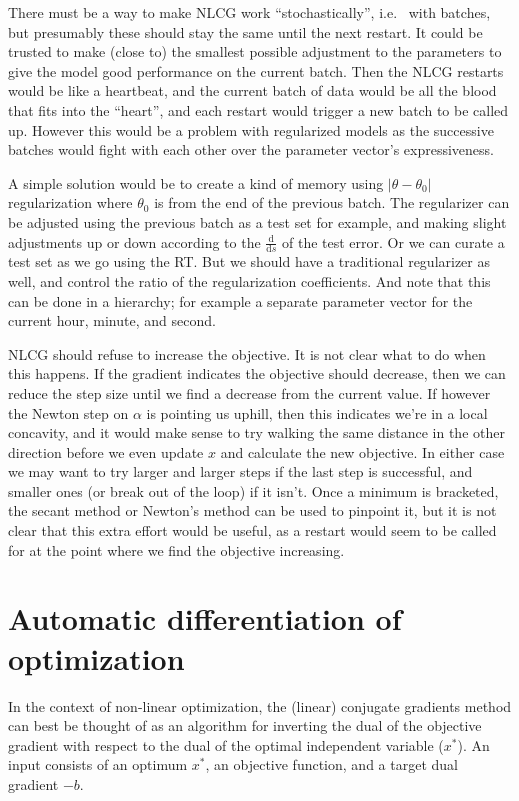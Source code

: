\documentclass[11pt]{article}
\newcommand{\abs}[1]{\left| #1 \right|}
\renewcommand{\(}{\left(}
\renewcommand{\)}{\right)}
\newcommand{\ud}{\mathrm{d}}
\newcommand{\dby}[2]{\frac{\ud #1}{\ud #2}}
\begin{document}
There must be a way to make NLCG work ``stochastically'', i.e.~ with
batches, but presumably these should stay the same until the next
restart. It could be trusted to make (close to) the smallest possible
adjustment to the parameters to give the model good performance on the
current batch. Then the NLCG restarts would be like a heartbeat, and the
current batch of data would be all the blood that fits into the
``heart'', and each restart would trigger a new batch to be called up.
However this would be a problem with regularized models as the
successive batches would fight with each other over the parameter
vector's expressiveness.

A simple solution would be to create a kind of memory using
$\abs{\theta-\theta_0}$ regularization where $\theta_0$ is from the
end of the previous batch. The regularizer can be adjusted using the
previous batch as a test set for example, and making slight
adjustments up or down according to the $\dby{}{s}$ of the test error.
Or we can curate a test set as we go using the RT. But we should have
a traditional regularizer as well, and control the ratio of the
regularization coefficients. And note that this can be done in a
hierarchy; for example a separate parameter vector for the current
hour, minute, and second.

NLCG should refuse to increase the objective. It is not clear what to
do when this happens. If the gradient indicates the objective should
decrease, then we can reduce the step size until we find a decrease
from the current value. If however the Newton step on $\alpha$ is
pointing us uphill, then this indicates we're in a local concavity,
and it would make sense to try walking the same distance in the other
direction before we even update $x$ and calculate the new objective.
In either case we may want to try larger and larger steps if the last
step is successful, and smaller ones (or break out of the loop) if it
isn't. Once a minimum is bracketed, the secant method or Newton's
method can be used to pinpoint it, but it is not clear that this extra
effort would be useful, as a restart would seem to be called for at the
point where we find the objective increasing.

\section{Automatic differentiation of optimization}

In the context of non-linear optimization, the (linear) conjugate
gradients method can best be thought of as an algorithm for inverting
the dual of the objective gradient with respect to the dual of the
optimal independent variable ($x^*$). An input consists of an optimum
$x^*$, an objective function, and a target dual gradient $-b$.
\end{document}
